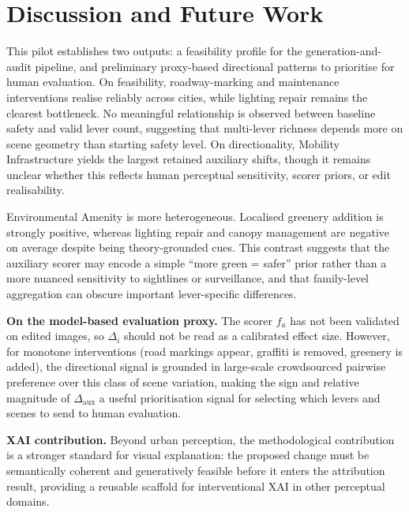 \section{Discussion and Future Work}
\label{sec:discussion}

This pilot establishes two outputs: a feasibility profile for the generation-and-audit pipeline, and preliminary proxy-based directional patterns to prioritise for human evaluation. On feasibility, roadway-marking and maintenance interventions realise reliably across cities, while lighting repair remains the clearest bottleneck. No meaningful relationship is observed between baseline safety and valid lever count, suggesting that multi-lever richness depends more on scene geometry than starting safety level. On directionality, Mobility Infrastructure yields the largest retained auxiliary shifts, though it remains unclear whether this reflects human perceptual sensitivity, scorer priors, or edit realisability.

Environmental Amenity is more heterogeneous. Localised greenery addition is strongly positive, whereas lighting repair and canopy management are negative on average despite being theory-grounded cues. This contrast suggests that the auxiliary scorer may encode a simple “more green = safer” prior rather than a more nuanced sensitivity to sightlines or surveillance, and that family-level aggregation can obscure important lever-specific differences.

\noindent\textbf{On the model-based evaluation proxy.} The scorer $f_a$ has not been validated on edited images, so $\Delta_i$ should not be read as a calibrated effect size. However, for monotone interventions (road markings appear, graffiti is removed, greenery is added), the directional signal is grounded in large-scale crowdsourced pairwise preference over this class of scene variation, making the sign and relative magnitude of $\Delta_{\mathrm{aux}}$ a useful prioritisation signal for selecting which levers and scenes to send to human evaluation.


\noindent\textbf{XAI contribution.} Beyond urban perception, the methodological contribution is a stronger standard for visual explanation: the proposed change must be semantically coherent and generatively feasible before it enters the attribution result, providing a reusable scaffold for interventional XAI in other perceptual domains.


